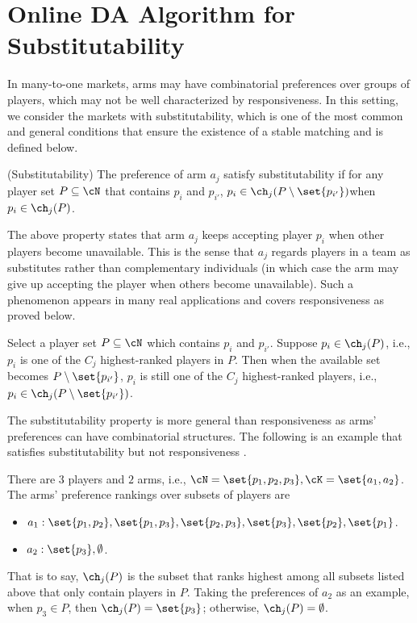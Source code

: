 \section{Online DA Algorithm for Substitutability }\label{sec:decen}

In many-to-one markets, arms may have combinatorial preferences over groups of players, which may not be well characterized by responsiveness. In this setting, we consider the markets with substitutability, which is one of the most common and general conditions that ensure the existence of a stable matching and is defined below. 


\begin{definition}{(Substitutability)}\label{def:substi}
The preference of arm $a_j$ satisfy substitutability if for any player set $P\subseteq \cN$ that contains $p_i$ and $p_{i'}$, $p_i \in \ch_j(P\setminus \set{p_{i'}})$when $p_i \in \ch_j(P)$.
\end{definition}

The above property states that arm $a_j$ keeps accepting player $p_i$ when other players become unavailable. This is the sense that $a_j$ regards players in a team as substitutes rather than complementary individuals (in which case the arm may give up accepting the player when others become unavailable). 
Such a phenomenon appears in many real applications and covers responsiveness as proved below. 


\begin{remark} 
Select a player set $P\subseteq \cN$ which contains $p_{i}$ and $p_{i'}$. 
Suppose $p_i \in \ch_j(P)$, i.e., $p_i$ is one of the $C_j$ highest-ranked players in $P$.  
Then when the available set becomes $P\setminus\set{p_{i'}}$, 
$p_i$ is still one of the $C_j$ highest-ranked players, i.e., $p_i \in \ch_j(P\setminus\set{p_{i'}})$.
\end{remark}


The substitutability property is more general than responsiveness as arms' preferences can have combinatorial structures. The following is an example that satisfies substitutability but not responsiveness \cite{roth1992two}. 

\begin{example}
There are $3$ players and $2$ arms, i.e., $\cN=\set{p_1,p_2,p_3}, \cK=\set{a_1, a_2}$. 
The arms' preference rankings over subsets of players are
\begin{itemize}
    \item $a_1: \set{p_1,p_2},\set{p_1,p_3},\set{p_2,p_3},\set{p_3},\set{p_2},\set{p_1}$.
    \item $a_2: \set{p_3},\emptyset$.
\end{itemize}
That is to say, $\ch_j(P)$ is the subset that ranks highest among all subsets listed above that only contain players in $P$. Taking the preferences of $a_2$ as an example, when $p_3 \in P$, then $\ch_j(P)=\set{p_3}$; otherwise, $\ch_j(P)=\emptyset$. 
\end{example}


